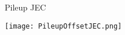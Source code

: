 {

}

\begin{frame}{Pileup JEC}
\vspace{-.2cm}
\begin{center}
    \texttt{[image: PileupOffsetJEC.png]}
\end{center}


\end{frame}

%
%
